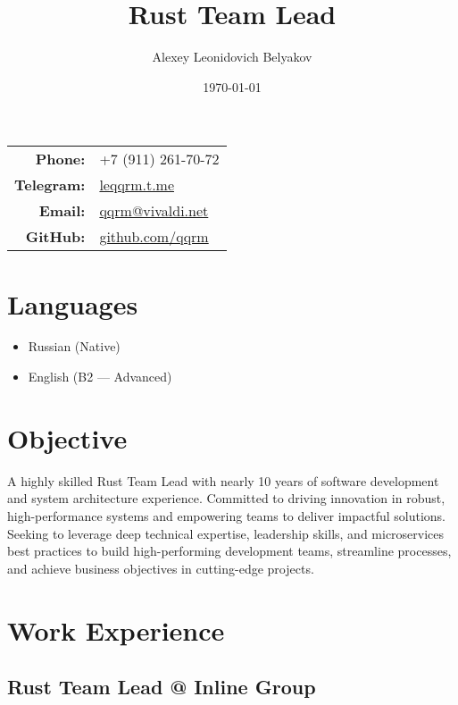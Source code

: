 \documentclass[a4paper,12pt]{article}
\title{\textbf{Rust Team Lead}}
\author{Alexey Leonidovich Belyakov}
\date{\today}
\begin{document}
\maketitle

\begin{center}
    \begin{tabular}{rl}
        \textbf{Phone:} & +7 (911) 261-70-72 \\
        \textbf{Telegram:} & \href{https://leqqrm.t.me}{leqqrm.t.me} \\
        \textbf{Email:} & \href{mailto:qqrm@vivaldi.net}{qqrm@vivaldi.net} \\
        \textbf{GitHub:} & \href{https://github.com/qqrm}{github.com/qqrm} \\
    \end{tabular}
\end{center}

\vspace{5mm}

\section*{Languages}
\begin{itemize}[leftmargin=15pt]
    \item Russian (Native)
    \item English (B2 — Advanced)
\end{itemize}

\section*{Objective}
A highly skilled Rust Team Lead with nearly 10 years of software development and system architecture experience. Committed to driving innovation in robust, high-performance systems and empowering teams to deliver impactful solutions. Seeking to leverage deep technical expertise, leadership skills, and microservices best practices to build high-performing development teams, streamline processes, and achieve business objectives in cutting-edge projects.

\section*{Work Experience}

\subsection*{Rust Team Lead @ Inline Group}
\end{document}
